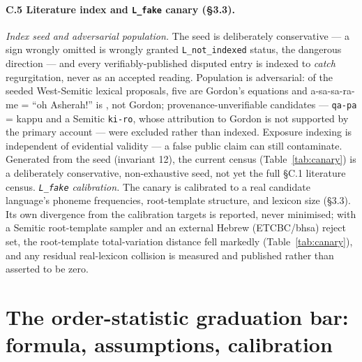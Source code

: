 \paragraph{C.5 Literature index and \texttt{L\_fake} canary (\S3.3).} \emph{Index seed and adversarial population.}
The seed is deliberately conservative --- a sign wrongly omitted is wrongly
granted \texttt{L\_not\_indexed} status, the dangerous direction --- and
every verifiably-published disputed entry is indexed to \emph{catch}
regurgitation, never as an
accepted reading. Population is adversarial: of the seeded West-Semitic
lexical proposals, five are Gordon's equations and a-sa-sa-ra-me = ``oh
Asherah!'' is \citet{best1981}, not Gordon; provenance-unverifiable
candidates --- \texttt{qa-pa} = kappu and a Semitic \texttt{ki-ro}, whose
attribution to Gordon is not supported by the primary account
\citep{rendsburg1996} --- were excluded rather than indexed. Exposure
indexing is independent of evidential validity --- a false public claim
can still contaminate. Generated from the
seed (invariant 12), the current census (Table~\ref{tab:canary}) is a
deliberately conservative, non-exhaustive seed, not yet the full \S C.1
literature census.
\emph{\texttt{L\_fake} calibration.} The canary is calibrated to a real
candidate language's phoneme frequencies, root-template structure, and
lexicon size (\S3.3). Its own divergence from the calibration
targets is reported, never minimised; with a Semitic root-template sampler
and an external Hebrew (ETCBC/bhsa) reject set, the root-template
total-variation distance fell markedly (Table~\ref{tab:canary}), and any
residual real-lexicon collision is measured and published rather than
asserted to be zero.

\section{The order-statistic graduation bar: formula, assumptions,
calibration}

